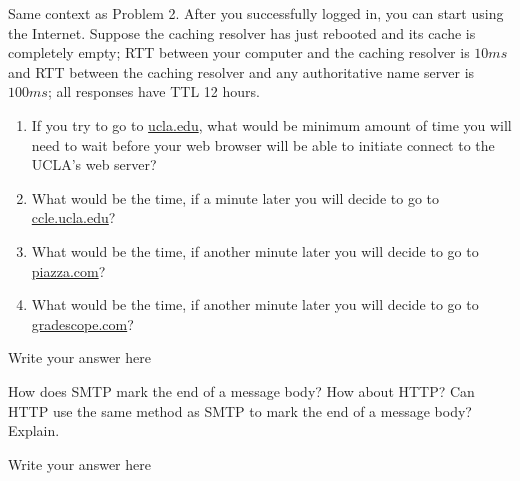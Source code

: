 \documentclass{report}
\begin{document}
\clearpage
\begin{problem}

  Same context as Problem 2. After you successfully logged in, you can start using the Internet.  Suppose the caching resolver has just rebooted and its cache is completely empty;  RTT between your computer and the caching resolver is $10 ms$ and RTT between the caching resolver and any authoritative name server is $100 ms$; all responses have TTL 12 hours.

\begin{enumerate}
\item If you try to go to \url{ucla.edu}, what would be minimum amount of time you will need to wait before your web browser will be able to initiate connect to the UCLA's web server?

\item What would be the time, if a minute later you will decide to go to \url{ccle.ucla.edu}?

\item What would be the time, if another minute later you will decide to go to \url{piazza.com}?

\item What would be the time, if another minute later you will decide to go to \url{gradescope.com}?

\end{enumerate}

\begin{answer}{24em}
    Write your answer here

\end{answer}

\end{problem}
\clearpage

\begin{problem}
How does SMTP mark the end of a message body? How about HTTP? Can HTTP
use the same method as SMTP to mark the end of a message body? Explain.

\begin{answer}{24em}
    Write your answer here

\end{answer}
\end{problem}

\end{document}
